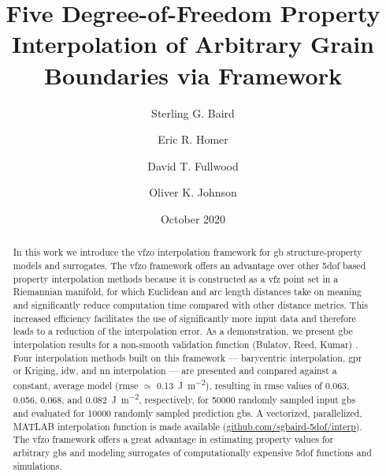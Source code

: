 \documentclass[preprint,12pt]{elsarticle}
\title{Five Degree-of-Freedom Property Interpolation of Arbitrary Grain Boundaries via \glsentrytitlecase{vfzo}{long} Framework}
\author[myu]{Sterling G. Baird}
\author[myu]{Eric R. Homer}
\author[myu]{David T. Fullwood}
\author[myu]{Oliver K. Johnson}\corref{cor1}
\date{October 2020}
\begin{document}
\begin{abstract}
    In this work we introduce the \gls{vfzo} interpolation framework for \gls{gb} structure-property models and surrogates. The \gls{vfzo} framework offers an advantage over other \gls{5dof} based property interpolation methods because it is constructed as a \gls{vfz} point set in a Riemannian manifold, for which Euclidean and arc length distances take on meaning and significantly reduce computation time compared with other distance metrics. This increased efficiency facilitates the use of significantly more input data and therefore leads to a reduction of the interpolation error. As a demonstration, we present \gls{gbe} interpolation results for a non-smooth validation function (Bulatov, Reed, Kumar) \cite{bulatovGrainBoundaryEnergy2014}.
    Four interpolation methods built on this framework --- barycentric interpolation, \gls{gpr} or Kriging, \gls{idw}, and \gls{nn} interpolation --- are presented and compared against a constant, average model (\gls{rmse} $\simeq$ \SI{0.13}{\J\per\square\meter}), resulting in \gls{rmse} values of 0.063, 0.056, 0.068, and \SI{0.082}{\J\per\square\meter}, respectively, for \num{50000} randomly sampled input \glspl{gb} and evaluated for \num{10000} randomly sampled prediction \glspl{gb}. A vectorized, parallelized, MATLAB interpolation function is made available (\url{github.com/sgbaird-5dof/interp}). The \gls{vfzo} framework offers a great advantage in estimating property values for arbitrary \glspl{gb} and modeling surrogates of computationally expensive \gls{5dof} functions and simulations.
\end{abstract}
\end{document}
